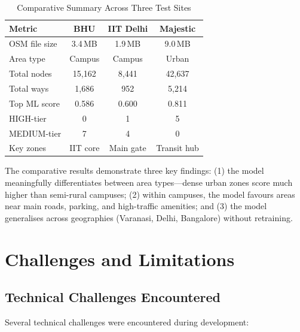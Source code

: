 \documentclass[conference]{IEEEtran}
\begin{document}
\begin{table}[htbp]
\caption{Comparative Summary Across Three Test Sites}
\begin{center}
\begin{tabular}{|l|c|c|c|}
\hline
\textbf{Metric} & \textbf{BHU} & \textbf{IIT Delhi} & \textbf{Majestic} \\
\hline
OSM file size & 3.4\,MB & 1.9\,MB & 9.0\,MB \\
\hline
Area type & Campus & Campus & Urban \\
\hline
Total nodes & 15,162 & 8,441 & 42,637 \\
\hline
Total ways & 1,686 & 952 & 5,214 \\
\hline
Top ML score & 0.586 & 0.600 & 0.811 \\
\hline
HIGH-tier & 0 & 1 & 5 \\
\hline
MEDIUM-tier & 7 & 4 & 0 \\
\hline
Key zones & IIT core & Main gate & Transit hub \\
\hline
\end{tabular}
\label{tab:comp}
\end{center}
\end{table}

The comparative results demonstrate three key findings: (1) the model meaningfully differentiates between area types---dense urban zones score much higher than semi-rural campuses; (2) within campuses, the model favours areas near main roads, parking, and high-traffic amenities; and (3) the model generalises across geographies (Varanasi, Delhi, Bangalore) without retraining.


\section{Challenges and Limitations}

\subsection{Technical Challenges Encountered}

Several technical challenges were encountered during development:
\end{document}
